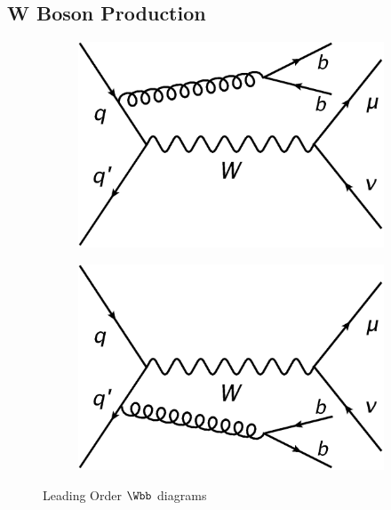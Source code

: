 \subsection{W Boson Production}
\begin{figure}[hb]
\centering
  \begin{subfigure}[b]{.35\textwidth}
	\includegraphics[width=\textwidth]{images/Wbb1.png} 
	\end{subfigure}	
   \begin{subfigure}[b]{.35\textwidth}
	\includegraphics[width=\textwidth]{images/Wbb2.png}
    \end{subfigure}	
  	\caption[Leading Order $\Wbb$ diagrams]
   	{Leading Order $\Wbb$ diagrams}

	\label{fig:WbbLO}
\end{figure}

